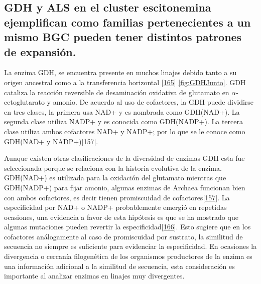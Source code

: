 \documentclass[12pt,twoside]{reedthesis}
\begin{document}
  \subsection{GDH y ALS en el cluster escitonemina ejemplifican como
  familias pertenecientes a un mismo BGC pueden tener distintos patrones
  de
  expansión.}\label{gdh-y-als-en-el-cluster-escitonemina-ejemplifican-como-familias-pertenecientes-a-un-mismo-bgc-pueden-tener-distintos-patrones-de-expansion.}
  
  La enzima GDH, se encuentra presente en muchos linajes debido tanto a su
  origen ancestral como a la transferencia horizontal
  {[}\protect\hyperlink{ref-andersson_evolution_2003}{165}{]}
  \autoref{fig:GDHJunto}. GDH cataliza la reacción reversible de
  desaminación oxidativa de glutamato en \(\alpha\)-cetoglutarato y
  amonio. De acuerdo al uso de cofactores, la GDH puede dividirse en tres
  clases, la primera usa NAD+ y es nombrada como GDH(NAD+). La segunda
  clase utiliza NADP+ y es conocida como GDH(NADP+). La tercera clase
  utiliza ambos cofactores NAD+ y NADP+; por lo que se le conoce como
  GDH(NAD+ y
  NADP+){[}\protect\hyperlink{ref-engel_glutamate_2014}{157}{]}.
  
  Aunque existen otras clasificaciones de la diversidad de enzimas GDH
  esta fue seleccionada porque se relaciona con la historia evolutiva de
  la enzima. GDH(NAD+) es utilizada para la oxidación del glutamato
  mientras que GDH(NADP+) para fijar amonio, algunas enzimas de Archaea
  funcionan bien con ambos cofactores, es decir tienen promiscuidad de
  cofactores{[}\protect\hyperlink{ref-engel_glutamate_2014}{157}{]}. La
  especificidad por NAD+ o NADP+ probablemente emergió en repetidas
  ocasiones, una evidencia a favor de esta hipótesis es que se ha mostrado
  que algunas mutaciones pueden revertir la
  especificidad{[}\protect\hyperlink{ref-lilley_partial_1991}{166}{]}.
  Esto sugiere que en los cofactores análogamente al caso de promiscuidad
  por sustrato, la similitud de secuencia no siempre es suficiente para
  evidenciar la especificidad. En ocasiones la divergencia o cercanía
  filogenética de los organismos productores de la enzima es una
  información adicional a la similitud de secuencia, esta consideración es
  importante al analizar enzimas en linajes muy divergentes.
  
\end{document}
